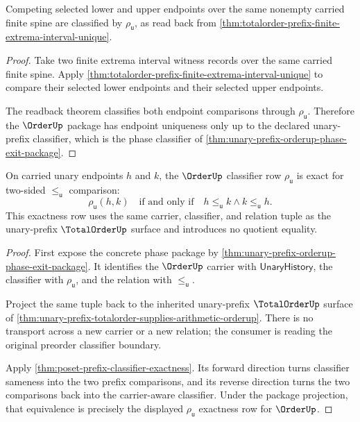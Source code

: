 \begin{theorem}
\label{thm:unary-prefix-orderup-endpoint-uniqueness-obligation}
Competing selected lower and upper endpoints over the same nonempty carried
finite spine are classified by $\rho_{\mathsf{u}}$, as read back from
\autoref{thm:totalorder-prefix-finite-extrema-interval-unique}.
\end{theorem}
\begin{proof}
Take two finite extrema interval witness records over the same carried finite
spine. Apply
\autoref{thm:totalorder-prefix-finite-extrema-interval-unique} to compare their
selected lower endpoints and their selected upper endpoints.

The readback theorem classifies both endpoint comparisons through
$\rho_{\mathsf{u}}$. Therefore the $\OrderUp$ package has endpoint uniqueness
only up to the declared unary-prefix classifier, which is the phase classifier
of \autoref{thm:unary-prefix-orderup-phase-exit-package}.
\end{proof}

\begin{theorem}
\label{thm:unary-prefix-orderup-exactness-obligation}
On carried unary endpoints $h$ and $k$, the $\OrderUp$ classifier row
$\rho_{\mathsf{u}}$ is exact for two-sided $\le_{\mathsf{u}}$ comparison:
$$
\rho_{\mathsf{u}}(h,k)
\quad\text{if and only if}\quad
h\le_{\mathsf{u}}k\land k\le_{\mathsf{u}}h.
$$
This exactness row uses the same carrier, classifier, and relation tuple as the
unary-prefix $\TotalOrderUp$ surface and introduces no quotient equality.
\end{theorem}
\begin{proof}
First expose the concrete phase package by
\autoref{thm:unary-prefix-orderup-phase-exit-package}. It identifies the
$\OrderUp$ carrier with $\mathsf{UnaryHistory}$, the classifier with
$\rho_{\mathsf{u}}$, and the relation with $\le_{\mathsf{u}}$.

Project the same tuple back to the inherited unary-prefix $\TotalOrderUp$
surface of \autoref{thm:unary-prefix-totalorder-supplies-arithmetic-orderup}.
There is no transport across a new carrier or a new relation; the consumer is
reading the original preorder classifier boundary.

Apply \autoref{thm:poset-prefix-classifier-exactness}. Its forward direction
turns classifier sameness into the two prefix comparisons, and its reverse
direction turns the two comparisons back into the carrier-aware classifier.
Under the package projection, that equivalence is precisely the displayed
$\rho_{\mathsf{u}}$ exactness row for $\OrderUp$.
\end{proof}

